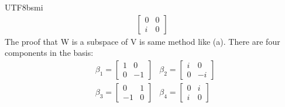 \documentclass[12pt, a4paper]{article}
\begin{document}
\begin{CJK*}{UTF8}{bsmi}
\begin{align}
\begin{bmatrix}
        0 & 0\\
        i & 0
    \end{bmatrix}
\end{align}
The proof that W is a subspace of V is same method like (a). There are four components in the basis:
\begin{align}
    &\beta_1 = \begin{bmatrix}
        1 & 0\\
        0 & -1
    \end{bmatrix} &\beta_2 = \begin{bmatrix}
        i & 0\\
        0 & -i
    \end{bmatrix}\\
    &\beta_3 = \begin{bmatrix}
        0 & 1\\
        -1 & 0
    \end{bmatrix} &\beta_4 = \begin{bmatrix}
        0 & i \\
        i & 0
    \end{bmatrix}
\end{align}
\end{CJK*}
\end{document}

